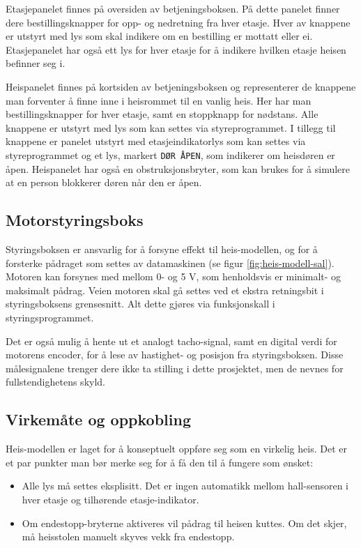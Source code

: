 \begin{alphasection}
Etasjepanelet finnes på oversiden av betjeningsboksen. På dette panelet finner dere bestillingsknapper for opp- og nedretning fra hver etasje. Hver av knappene er utstyrt med lys som skal indikere om en bestilling er mottatt eller ei. Etasjepanelet har også ett lys for hver etasje for å indikere hvilken etasje heisen befinner seg i.

Heispanelet finnes på kortsiden av betjeningsboksen og representerer de knappene man forventer å finne inne i heisrommet til en vanlig heis. Her har man bestillingsknapper for hver etasje, samt en stoppknapp for nødstans. Alle knappene er utstyrt med lys som kan settes via styreprogrammet. I tillegg til knappene er panelet utstyrt med etasjeindikatorlys som kan settes via styreprogrammet og et lys, markert \verb|DØR ÅPEN|, som indikerer om heisdøren er åpen. Heispanelet har også en obstruksjonsbryter, som kan brukes for å simulere at en person blokkerer døren når den er åpen.

\subsection{Motorstyringsboks}

Styringsboksen er ansvarlig for å forsyne effekt til heis-modellen, og for å forsterke pådraget som settes av datamaskinen (se figur \ref{fig:heis-modell-sal}). Motoren kan forsynes med mellom 0- og 5 V, som henholdsvis er minimalt- og maksimalt pådrag. Veien motoren skal gå settes ved et ekstra retningsbit i styringsboksens grensesnitt. Alt dette gjøres via funksjonskall i styringsprogrammet. 

Det er også mulig å hente ut et analogt tacho-signal, samt en digital verdi for motorens encoder, for å lese av hastighet- og posisjon fra styringsboksen. Disse målesignalene trenger dere ikke ta stilling i dette prosjektet, men de nevnes for fullstendighetens skyld.

\subsection{Virkemåte og oppkobling}
Heis-modellen er laget for å konseptuelt oppføre seg som en virkelig heis. Det er et par punkter man bør merke seg for å få den til å fungere som ønsket:

\begin{itemize}
    \item Alle lys må settes eksplisitt. Det er ingen automatikk mellom hall-sensoren i hver etasje og tilhørende etasje-indikator.
    \item Om endestopp-bryterne aktiveres vil pådrag til heisen kuttes. Om det skjer, må heisstolen manuelt skyves vekk fra endestopp.
    

\end{itemize}
\end{alphasection}
